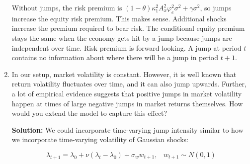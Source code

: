 \documentclass{article}
\begin{document}
\begin{enumerate}
Without jumps, the risk premium is $(1 - \theta) \kappa_1^2 A_x^2 \varphi_e^2 \sigma^2  + \gamma \sigma^2$, so jumps increase the equity risk premium.  This makes sense. Additional shocks increase the premium required to bear risk.  The conditional equity premium stays the same when the economy gets hit by a jump because jumps are independent over time.  Risk premium is forward looking.  A jump at period $t$ contains no information about where there will be a jump in period $t+1$.

\pagebreak

\item In our setup, market volatility is constant. However, it is well known that return volatility fluctuates over time, and it can also jump upwards. Further, a lot of empirical evidence suggests that positive jumps in market volatility happen at times of large negative jumps in market returns themselves. How would you extend the model to capture this effect?

\bigskip

\textbf{Solution:} We could incorporate time-varying jump intensity similar to how we incorporate time-varying volatility of Gaussian shocks:

$$
\lambda_{t+1} = \lambda_0 + \nu ( \lambda_t - \lambda_0) + \sigma_w w_{t+1}, \; \; \; w_{t+1} \sim N(0,1)
$$

\end{enumerate}
\end{document}
